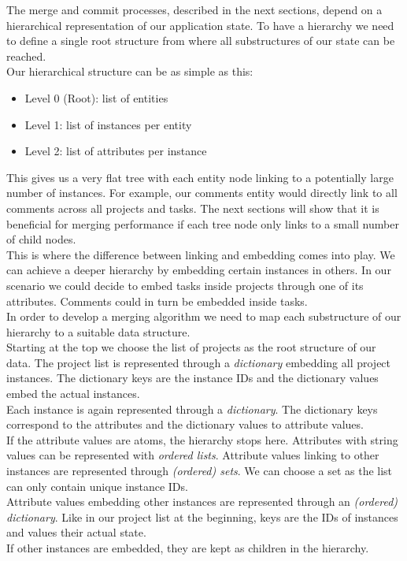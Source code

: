 The merge and commit processes, described in the next sections, depend on a hierarchical representation of our application state.
To have a hierarchy we need to define a single root structure from where all substructures of our state can be reached.\\
Our hierarchical structure can be as simple as this:

\begin{itemize}
\item Level 0 (Root): list of entities
\item Level 1: list of instances per entity
\item Level 2: list of attributes per instance
\end{itemize}

This gives us a very flat tree with each entity node linking to a potentially large number of instances.
For example, our comments entity would directly link to all comments across all projects and tasks.
The next sections will show that it is beneficial for merging performance if each tree node only links to a small number of child nodes.\\
This is where the difference between linking and embedding comes into play.
We can achieve a deeper hierarchy by embedding certain instances in others.
In our scenario we could decide to embed tasks inside projects through one of its attributes.
Comments could in turn be embedded inside tasks.\\
In order to develop a merging algorithm we need to map each substructure of our hierarchy to a suitable data structure.\\
Starting at the top we choose the list of projects as the root structure of our data.
The project list is represented through a \emph{dictionary} embedding all project instances.
The dictionary keys are the instance IDs and the dictionary values embed the actual instances.\\
Each instance is again represented through a \emph{dictionary}.
The dictionary keys correspond to the attributes and the dictionary values to attribute values.\\
If the attribute values are atoms, the hierarchy stops here.
Attributes with string values can be represented with \emph{ordered lists}.
Attribute values linking to other instances are represented through \emph{(ordered) sets}.
We can choose a set as the list can only contain unique instance IDs.\\
Attribute values embedding other instances are represented through an \emph{(ordered) dictionary}.
Like in our project list at the beginning, keys are the IDs of instances and values their actual state.\\
If other instances are embedded, they are kept as children in the hierarchy.\\

